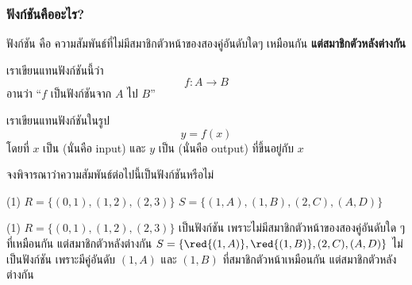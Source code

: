 \begin{frame}
\frametitle{ฟังก์ชันคืออะไร?}
\begin{defn}{}{}
ฟังก์ชัน คือ ความสัมพันธ์ที่ไม่มีสมาชิกตัวหน้าของสองคู่อันดับใดๆ เหมือนกัน \textbf{แต่สมาชิกตัวหลังต่างกัน} \pa
\medskip

เราเขียนแทนฟังก์ชันนี้ว่า 
\[f: A \rightarrow B\]
\pa อานว่า ``$f$ เป็นฟังก์ชันจาก $A$ ไป $B$''
\end{defn}
\pa
เราเขียนแทนฟังก์ชันในรูป
\[ y = f(x) \]
\pa โดยที่ $x$ เป็น  (นั่นคือ input) \pa และ $y$ เป็น  (นั่นคือ output) ที่ขึ้นอยู่กับ $x$
\end{frame}


\begin{frame}[t]
\begin{ex}
จงพิจารณาว่าความสัมพันธ์ต่อไปนี้เป็นฟังก์ชันหรือไม่
\begin{tasks}(1)
\task $R = \{(0,1), (1,2), (2,3)\}$
\task $S = \{(1,A), (1,B), (2,C), (A, D)\}$
\end{tasks}
\end{ex}
\begin{sol}
\begin{tasks}(1)
\task $R = \{(0,1), (1,2), (2,3)\}$ \pa เป็นฟังก์ชัน \pa เพราะไม่มีสมาชิกตัวหน้าของสองคู่อันดับใด ๆ ที่เหมือนกัน แต่สมาชิกตัวหลังต่างกัน
\task $S = \{\red{(1,A)}, \red{(1,B)}, (2,C), (A, D)\}$ \pa ไม่เป็นฟังก์ชัน \pa เพราะมีคู่อันดับ $(1,A)$ และ $(1,B)$ ที่สมาชิกตัวหน้าเหมือนกัน แต่สมาชิกตัวหลังต่างกัน
\end{tasks}
\end{sol}
\end{frame}

